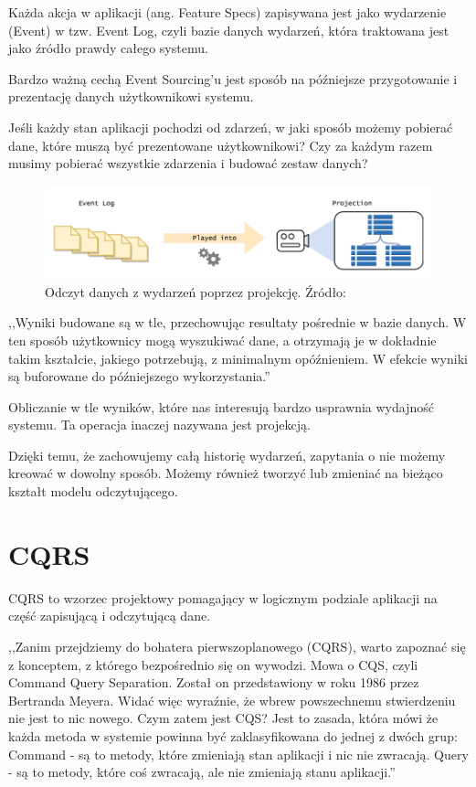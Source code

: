 Każda akcja w aplikacji (ang. Feature Specs) zapisywana jest jako wydarzenie (Event) w tzw. Event Log, czyli bazie danych wydarzeń, która traktowana jest jako źródło prawdy całego systemu.

Bardzo ważną cechą Event Sourcing'u jest sposób na późniejsze przygotowanie i prezentację danych użytkownikowi systemu.

Jeśli każdy stan aplikacji pochodzi od zdarzeń, w jaki sposób możemy pobierać dane, które muszą być prezentowane użytkownikowi? Czy za każdym razem musimy pobierać wszystkie zdarzenia i budować zestaw danych?

\begin{figure}[h!]
  \centering
    \includegraphics[width=1.0\textwidth]{images/eventsourcing2.png}
  \caption{Odczyt danych z wydarzeń poprzez projekcję. Źródło: \cite{EventSourcing1} }
\end{figure}

,,Wyniki budowane są w tle, przechowując resultaty pośrednie w bazie danych. W ten sposób użytkownicy mogą wyszukiwać dane, a otrzymają je w dokładnie takim kształcie, jakiego potrzebują, z minimalnym opóźnieniem. W efekcie wyniki są buforowane do późniejszego wykorzystania.'' \cite{EventSourcing1}

Obliczanie w tle wyników, które nas interesują bardzo usprawnia wydajność systemu. Ta operacja inaczej nazywana jest projekcją.

Dzięki temu, że zachowujemy całą historię wydarzeń, zapytania o nie możemy kreować w dowolny sposób. Możemy również tworzyć lub zmieniać na bieżąco kształt modelu odczytującego.


\section{CQRS}

CQRS to wzorzec projektowy pomagający w logicznym podziale aplikacji na część zapisującą i odczytującą dane.

,,Zanim przejdziemy do bohatera pierwszoplanowego (CQRS), warto zapoznać się z konceptem, z którego bezpośrednio się on wywodzi. Mowa o CQS, czyli Command Query Separation. Został on przedstawiony w roku 1986 przez Bertranda Meyera. Widać więc wyraźnie, że wbrew powszechnemu stwierdzeniu nie jest to nic nowego. Czym zatem jest CQS? Jest to zasada, która mówi że każda metoda w systemie powinna być zaklasyfikowana do jednej z dwóch grup:
Command - są to metody, które zmieniają stan aplikacji i nic nie zwracają.
Query - są to metody, które coś zwracają, ale nie zmieniają stanu aplikacji.''\cite{cqrs1}

